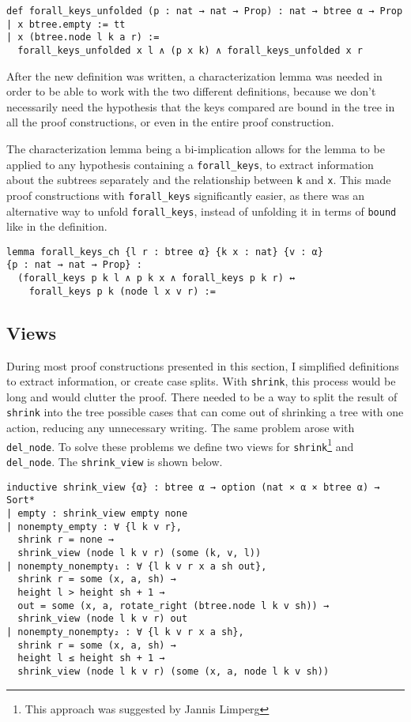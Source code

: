 \begin{lstlisting}
def forall_keys_unfolded (p : nat → nat → Prop) : nat → btree α → Prop
| x btree.empty := tt
| x (btree.node l k a r) :=
  forall_keys_unfolded x l ∧ (p x k) ∧ forall_keys_unfolded x r
\end{lstlisting}

After the new definition was written, a characterization lemma was needed in order to be able to work with the two different definitions, because we don't necessarily need the hypothesis that the keys compared are bound in the tree in all the proof constructions, or even in the entire proof construction.

The characterization lemma being a bi-implication allows for the lemma to be applied to any hypothesis containing a \lstinline{forall_keys}, to extract information about the subtrees separately and the relationship between \lstinline{k} and \lstinline{x}. This made proof constructions with \lstinline{forall_keys} significantly easier, as there was an alternative way to unfold \lstinline{forall_keys}, instead of unfolding it in terms of \lstinline{bound} like in the definition. 

\begin{lstlisting}
lemma forall_keys_ch {l r : btree α} {k x : nat} {v : α} 
{p : nat → nat → Prop} :
  (forall_keys p k l ∧ p k x ∧ forall_keys p k r) ↔ 
    forall_keys p k (node l x v r) :=
\end{lstlisting}

\subsection*{Views}

During most proof constructions presented in this section, I simplified definitions to extract information, or create case splits. With \lstinline{shrink}, this process would be long and would clutter the proof. There needed to be a way to split the result of \lstinline{shrink} into the tree possible cases that can come out of shrinking a tree with one action, reducing any unnecessary writing. The same problem arose with \lstinline{del_node}. To solve these problems we define two views for \lstinline{shrink}\footnote{This approach was suggested by Jannis Limperg} and \lstinline{del_node}. The \lstinline{shrink_view} is shown below.

\begin{lstlisting}
inductive shrink_view {α} : btree α → option (nat × α × btree α) → Sort*
| empty : shrink_view empty none
| nonempty_empty : ∀ {l k v r},
  shrink r = none →
  shrink_view (node l k v r) (some (k, v, l))
| nonempty_nonempty₁ : ∀ {l k v r x a sh out},
  shrink r = some (x, a, sh) →
  height l > height sh + 1 →
  out = some (x, a, rotate_right (btree.node l k v sh)) →
  shrink_view (node l k v r) out
| nonempty_nonempty₂ : ∀ {l k v r x a sh},
  shrink r = some (x, a, sh) →
  height l ≤ height sh + 1 →
  shrink_view (node l k v r) (some (x, a, node l k v sh))
\end{lstlisting}

